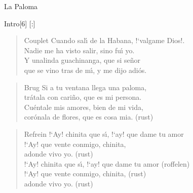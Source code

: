 \begin{song}[tango]{La Paloma}

%
%
\begin{instrumental}{Intro}[6]
\measure{}\measure{}[:] 
\end{instrumental}

\begin{verse}{Couplet}
Cuando sal\'{\i} de la Habana, !`valgame Dios!.\\
Nadie me ha visto salir, sino fu\'{\i} yo.\\
Y unalinda guachinanga, que si se\~{n}or\\
que se vino tras de m\'{\i}, y me dijo adi\'{o}s.
\end{verse}

\begin{verse}{Brug}
Si a tu ventana llega una paloma,\\
tr\'{a}tala con cari\~{n}o, que es mi persona.\\
Cu\'{e}ntale mis amores, bien de mi vida,\\
cor\'{o}nala de flores, que es cosa mia. \hspace{3em}(rust)
\end{verse}

\begin{verse}{Refrein}
!`Ay! chinita que s\'{\i}, !`ay! que dame tu amor\\
!`Ay! que vente conmigo, chinita,\chord{}\\ %
adonde vivo yo. \hspace{3em}(rust)\\
\vspace*{1\baselineskip}
!`Ay! chinita que s\'{\i}, !`ay! que dame tu amor \hspace{1em}(roffelen)\\
!`Ay! que vente conmigo, chinita,  \hspace{5em}(rust)\\
adonde vivo yo. \hspace{3em}(rust)
\end{verse}


\vspace{2ex}\vspace{-2.5ex}
\end{song}

